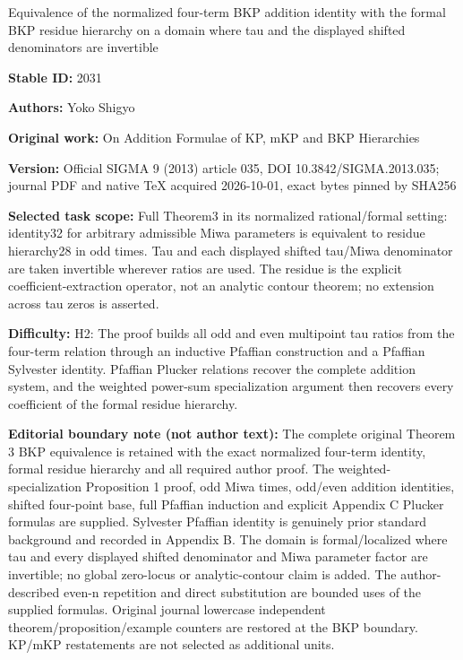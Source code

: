 \documentclass[11pt]{article}
\begin{document}
\begin{center}\Large Equivalence of the normalized four-term BKP addition identity with the formal BKP residue hierarchy on a domain where tau and the displayed shifted denominators are invertible\end{center}
\noindent\textbf{Stable ID:} 2031\par
\noindent\textbf{Authors:} Yoko Shigyo\par
\noindent\textbf{Original work:} On Addition Formulae of KP, mKP and BKP Hierarchies\par
\noindent\textbf{Version:} Official SIGMA 9 (2013) article 035, DOI 10.3842/SIGMA.2013.035; journal PDF and native TeX acquired 2026-10-01, exact bytes pinned by SHA256\par
\noindent\textbf{Selected task scope:} Full Theorem3 in its normalized rational/formal setting: identity32 for arbitrary admissible Miwa parameters is equivalent to residue hierarchy28 in odd times. Tau and each displayed shifted tau/Miwa denominator are taken invertible wherever ratios are used. The residue is the explicit coefficient-extraction operator, not an analytic contour theorem; no extension across tau zeros is asserted.\par
\noindent\textbf{Difficulty:} H2: The proof builds all odd and even multipoint tau ratios from the four-term relation through an inductive Pfaffian construction and a Pfaffian Sylvester identity. Pfaffian Plucker relations recover the complete addition system, and the weighted power-sum specialization argument then recovers every coefficient of the formal residue hierarchy.\par
\noindent\textbf{Editorial boundary note (not author text):} The complete original Theorem 3 BKP equivalence is retained with the exact normalized four-term identity, formal residue hierarchy and all required author proof. The weighted-specialization Proposition 1 proof, odd Miwa times, odd/even addition identities, shifted four-point base, full Pfaffian induction and explicit Appendix C Plucker formulas are supplied. Sylvester Pfaffian identity is genuinely prior standard background and recorded in Appendix B. The domain is formal/localized where tau and every displayed shifted denominator and Miwa parameter factor are invertible; no global zero-locus or analytic-contour claim is added. The author-described even-n repetition and direct substitution are bounded uses of the supplied formulas. Original journal lowercase independent theorem/proposition/example counters are restored at the BKP boundary. KP/mKP restatements are not selected as additional units.\par
\end{document}
